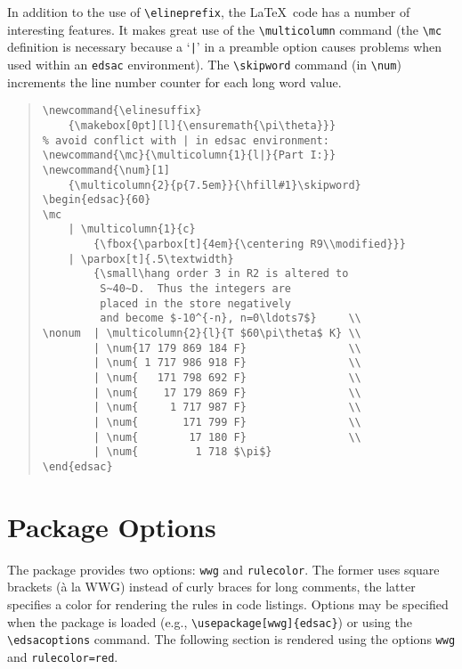 \documentclass[letterpaper,11pt]{article}
\newcommand{\hang}{\leftskip=1em\parindent=-1em}
\begin{document}
In addition to the use of \verb"\elineprefix", the \LaTeX\ code has
a number of interesting features.  It makes great use of the
\verb"\multicolumn" command (the \verb"\mc" definition is necessary because
a `\verb"|"' in a preamble option causes problems when used within
an \texttt{edsac} environment).  The \verb"\skipword" command (in
\verb"\num")
increments the line number counter for each long word value.
\begin{quote}\small
\begin{verbatim}
\newcommand{\elinesuffix}
    {\makebox[0pt][l]{\ensuremath{\pi\theta}}}
% avoid conflict with | in edsac environment:
\newcommand{\mc}{\multicolumn{1}{l|}{Part I:}}
\newcommand{\num}[1]
    {\multicolumn{2}{p{7.5em}}{\hfill#1}\skipword}
\begin{edsac}{60}
\mc
    | \multicolumn{1}{c}
        {\fbox{\parbox[t]{4em}{\centering R9\\modified}}}
    | \parbox[t]{.5\textwidth}
        {\small\hang order 3 in R2 is altered to
         S~40~D.  Thus the integers are
         placed in the store negatively
         and become $-10^{-n}, n=0\ldots7$}     \\
\nonum  | \multicolumn{2}{l}{T $60\pi\theta$ K} \\
        | \num{17 179 869 184 F}                \\
        | \num{ 1 717 986 918 F}                \\
        | \num{   171 798 692 F}                \\
        | \num{    17 179 869 F}                \\
        | \num{     1 717 987 F}                \\
        | \num{       171 799 F}                \\
        | \num{        17 180 F}                \\
        | \num{         1 718 $\pi$}
\end{edsac}
\end{verbatim}
\end{quote}

\section{Package Options}\label{options}
The package provides two options:  \verb"wwg" and \verb"rulecolor".
The former uses square brackets (\`a la WWG) instead of curly braces
for long comments, the latter specifies a color for rendering the
rules in code listings.  Options may be specified when the package is
loaded (e.g., \verb"\usepackage[wwg]{edsac}") or using the
\verb"\edsacoptions" command.  The following section is rendered
using the options \verb"wwg" and \verb"rulecolor=red".
\end{document}
